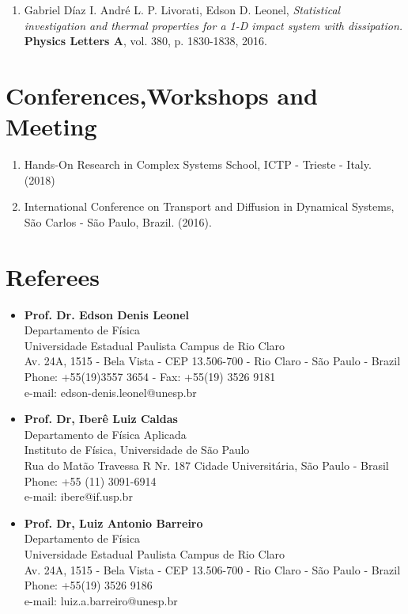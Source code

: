 \documentclass[margin,line]{resume}
\begin{document}
\begin{resume}
\begin{enumerate}
\item Gabriel D\'iaz I. Andr\'e L. P. Livorati, Edson D. Leonel, {\it Statistical investigation and thermal properties for a 1-D impact system with dissipation.} {\bf Physics Letters A}, vol. 380, p. 1830-1838, 2016.
\end{enumerate}

    
      \section{\mysidestyle Conferences,Workshops and Meeting}  
    
    \begin{enumerate}
\item  Hands-On Research in Complex Systems School, ICTP - Trieste - Italy. (2018)     
\item  International Conference on Transport and Diffusion in Dynamical Systems, S\~ao Carlos - S\~ao Paulo, Brazil. (2016).

\end{enumerate}


\section{\mysidestyle Referees} 


\begin{itemize}
    \item {\bf Prof. Dr. Edson Denis Leonel }  \\  Departamento de F\'isica  \\ Universidade Estadual Paulista Campus de Rio Claro \\Av. 24A, 1515 - Bela Vista - CEP 13.506-700 - Rio Claro - S\~ao Paulo - Brazil \\ Phone: +55(19)3557 3654 - Fax: +55(19) 3526 9181\\ e-mail: edson-denis.leonel@unesp.br \
    \item {\bf Prof. Dr, Iber\^e Luiz Caldas} \\ Departamento de F\'isica Aplicada \\ Instituto de F\'isica, Universidade de S\~ao Paulo
    \\ Rua do Mat\~ao Travessa R Nr. 187 Cidade Universit\'aria, S\~ao Paulo - Brasil \\ Phone: +55 (11) 3091-6914\\ e-mail: ibere@if.usp.br \ 
    \item {\bf Prof. Dr, Luiz Antonio Barreiro} \\ Departamento de F\'isica \\ Universidade Estadual Paulista Campus de Rio Claro \\Av. 24A, 1515 - Bela Vista - CEP 13.506-700 - Rio Claro - S\~ao Paulo - Brazil \\ Phone: +55(19) 3526 9186\\ e-mail: luiz.a.barreiro@unesp.br \
    

\end{itemize}
\end{resume}
\end{document}
